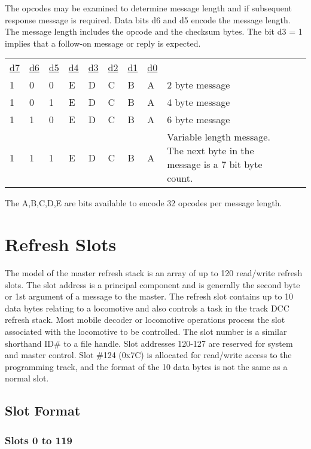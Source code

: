 The opcodes may be examined to determine message length and if subsequent response message is required. Data bits d6 and d5 encode the message length. The message length includes the opcode and the checksum bytes. The bit d3 = 1 implies that a follow-on message or reply is expected.

\begin{tabular}{p{0.05\linewidth} p{0.05\linewidth}  p{0.05\linewidth}  p{0.05\linewidth}  p{0.05\linewidth}  p{0.05\linewidth}  p{0.05\linewidth}  p{0.05\linewidth} p{0.5\linewidth} p{0.5\linewidth}} 
\underline{d7} & \underline{d6} & \underline{d5} & \underline{d4} & \underline{d3} & \underline{d2} & \underline{d1} & \underline{d0} & \\
1 & 0 & 0 & E & D & C & B & A & 2 byte message\\
1 & 0 & 1 & E & D & C & B & A & 4 byte message\\
1 & 1 & 0 & E & D & C & B & A & 6 byte message\\
1 & 1 & 1 & E & D & C & B & A & Variable length message. The next byte in the message is a 7 bit byte count.\\
\end{tabular}

The A,B,C,D,E are bits available to encode 32 opcodes per message length.

\section{Refresh Slots}
The model of the master refresh stack is an array of up to 120 read/write refresh slots. The slot address is a principal component and is generally the second byte or 1st argument of a message to the master. The refresh slot contains up to 10 data bytes relating to a locomotive and also controls a task in the track DCC refresh stack. Most mobile decoder or locomotive operations process the slot associated with the locomotive to be controlled. The slot number is a similar shorthand ID\# to a file handle. Slot addresses 120-127 are reserved for system and master control. Slot \#124 (0x7C) is allocated for read/write access to the programming track, and the format of the 10 data bytes is not the same as a normal slot. 

\subsection{Slot Format}

\subsubsection{Slots 0 to 119}


